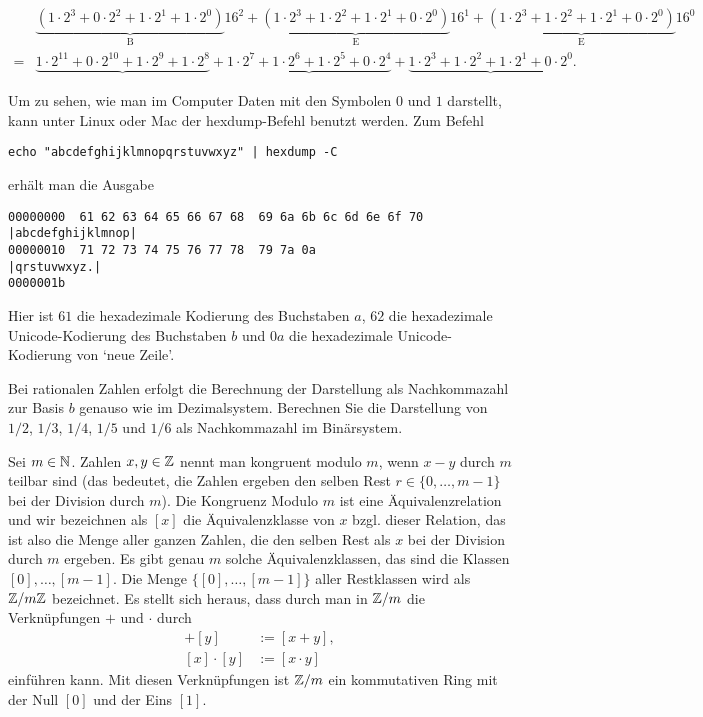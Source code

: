 \begin{bsp}
	{\scriptsize 
	\begin{align*}
		& \underbrace{(1\cdot 2^3 + 0 \cdot 2^2 + 1 \cdot 2^1+ 1 \cdot 2^0)}_{\operatorname{B}} 16^2 + \underbrace{(1 \cdot 2^3 + 1 \cdot 2^2 + 1 \cdot 2^1 + 0 \cdot 2^0)}_{\operatorname{E}} 16^1 + \underbrace{(1 \cdot 2^3 + 1 \cdot 2^2 + 1 \cdot 2^1 + 0 \cdot 2^0)}_{\operatorname{E}} 16^0  
		\\ = & \underbrace{1 \cdot 2^{11} + 0 \cdot 2^{10} + 1 \cdot 2^9 + 1 \cdot 2^8} + \underbrace{1 \cdot 2^7 + 1\cdot 2^6 + 1 \cdot 2^5 + 0 \cdot 2^4} + \underbrace{1 \cdot 2^3 + 1 \cdot 2^2 + 1 \cdot 2^1 + 0 \cdot 2^0}. 
	\end{align*}
	}
\end{bsp}

\begin{bem} 
Um zu sehen, wie man im Computer Daten mit den Symbolen $0$ und $1$ darstellt, kann unter Linux oder Mac der hexdump-Befehl benutzt werden. Zum Befehl
{\scriptsize 
	\begin{verbatim}
echo "abcdefghijklmnopqrstuvwxyz" | hexdump -C
	\end{verbatim}
}
erhält man die Ausgabe 
{\scriptsize 
	\begin{verbatim}
00000000  61 62 63 64 65 66 67 68  69 6a 6b 6c 6d 6e 6f 70  |abcdefghijklmnop|
00000010  71 72 73 74 75 76 77 78  79 7a 0a                 |qrstuvwxyz.|
0000001b
	\end{verbatim}
}
Hier ist $61$ die hexadezimale Kodierung des Buchstaben $a$, $62$ die hexadezimale Unicode-Kodierung des Buchstaben $b$ und $0a$ die hexadezimale Unicode-Kodierung von `neue Zeile'. 
\end{bem} 


\begin{aufg}
	Bei rationalen Zahlen erfolgt die Berechnung der Darstellung als Nachkommazahl zur Basis $b$ genauso wie im Dezimalsystem. Berechnen Sie die Darstellung von $1/2$, $1/3$, $1/4$, $1/5$ und $1/6$ als Nachkommazahl im Binärsystem. 
\end{aufg}

\begin{bem}[Restklassenringe] 
	Sei $m \in \mathbb{N}$. Zahlen $x,y \in \mathbb{Z}$ nennt man kongruent modulo $m$, wenn $x-y$ durch $m$ teilbar sind (das bedeutet, die Zahlen ergeben den selben Rest $r \in \{0,\ldots,m-1\}$ bei der Division durch $m$). Die Kongruenz Modulo $m$ ist eine Äquivalenzrelation und wir bezeichnen als $[x]$ die Äquivalenzklasse von $x$ bzgl. dieser Relation, das ist also die Menge aller ganzen Zahlen, die den selben Rest als $x$ bei der Division durch $m$ ergeben. Es gibt genau $m$ solche Äquivalenzklassen, das sind die Klassen $[0],\ldots,[m-1]$. Die Menge $\{[0],\ldots,[m-1]\}$ aller Restklassen wird als $\mathbb{Z} /m \mathbb{Z}$ bezeichnet. Es stellt sich heraus, dass durch man in $\mathbb{Z} / m$ die Verknüpfungen $+$ und $\cdot$ durch 
	\begin{align*}
			[x]+ [y] & := [x+y],
			\\ [x] \cdot [y] & := [x\cdot y]
	\end{align*} 
einführen kann. Mit diesen Verknüpfungen ist $\mathbb{Z} /  m$ ein kommutativen Ring mit der Null $[0]$ und der Eins $[1]$. 
\end{bem} 

